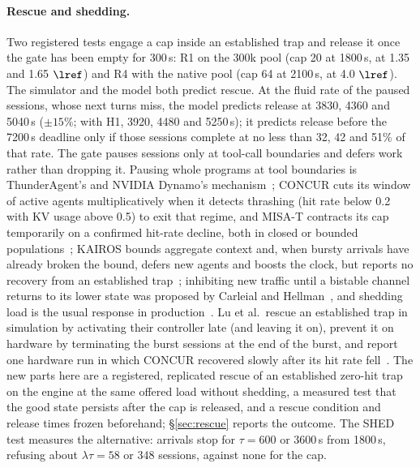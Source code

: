 \paragraph{Rescue and shedding.} Two registered tests engage a cap inside an established trap and release it once the gate has been empty for 300\,s: R1 on the 300k pool (cap 20 at 1800\,s, at 1.35 and 1.65 $\lref$) and R4 with the native pool (cap 64 at 2100\,s, at 4.0 $\lref$). The simulator and the model both predict rescue. At the fluid rate of the paused sessions, whose next turns miss, the model predicts release at 3830, 4360 and 5040\,s ($\pm15\%$; with H1, 3920, 4480 and 5250\,s); it predicts release before the 7200\,s deadline only if those sessions complete at no less than 32, 42 and 51\% of that rate. The gate pauses sessions only at tool-call boundaries and defers work rather than dropping it. Pausing whole programs at tool boundaries is ThunderAgent's and NVIDIA Dynamo's mechanism~\citep{kang2026thunderagent,dhanani2026dynamo}; CONCUR cuts its window of active agents multiplicatively when it detects thrashing (hit rate below 0.2 with KV usage above 0.5) to exit that regime, and MISA-T contracts its cap temporarily on a confirmed hit-rate decline, both in closed or bounded populations~\citep{chen2026concur,hong2026misat}; KAIROS bounds aggregate context and, when bursty arrivals have already broken the bound, defers new agents and boosts the clock, but reports no recovery from an established trap~\citep{yuan2026kairos}; inhibiting new traffic until a bistable channel returns to its lower state was proposed by Carleial and Hellman~\citep{carleial1975bistable}, and shedding load is the usual response in production~\citep{huang2022metastable}. Lu et al.\ rescue an established trap in simulation by activating their controller late (and leaving it on), prevent it on hardware by terminating the burst sessions at the end of the burst, and report one hardware run in which CONCUR recovered slowly after its hit rate fell~\citep{lu2026cachetrap}. The new parts here are a registered, replicated rescue of an established zero-hit trap on the engine at the same offered load without shedding, a measured test that the good state persists after the cap is released, and a rescue condition and release times frozen beforehand; \S\ref{sec:rescue} reports the outcome. The SHED test measures the alternative: arrivals stop for $\tau=600$ or 3600\,s from 1800\,s, refusing about $\lambda\tau=58$ or 348 sessions, against none for the cap.

